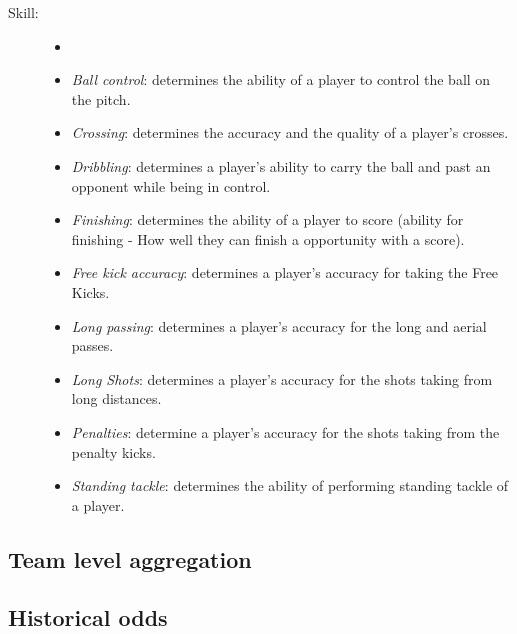 \begin{description}
\begin{itemize}
    \end{itemize}
    \item[Skill:]
    \begin{itemize}
        \itemsep0.3em
        \item[]
        \item{\textit{Ball control}:} determines the ability of a player to control the ball on the pitch.
        \item{\textit{Crossing}:} determines the accuracy and the quality of a player's crosses.
        \item{\textit{Dribbling}:} determines a player's ability to carry the ball and past an opponent while being in control.
        \item{\textit{Finishing}:} determines the ability of a player to score (ability for finishing - How well they can finish a opportunity with a score).
        \item{\textit{Free kick accuracy}:} determines a player's accuracy for taking the Free Kicks.
        \item{\textit{Long passing}:} determines a player's accuracy for the long and aerial passes.
        \item{\textit{Long Shots}:} determines a player's accuracy for the shots taking from long distances.
        \item{\textit{Penalties}:} determine a player's accuracy for the shots taking from the penalty kicks.
        \item{\textit{Standing tackle}:} determines the ability of performing standing tackle of a player.

    \end{itemize}

    \end{description}



\subsection{Team level aggregation}
\subsection{Historical odds}